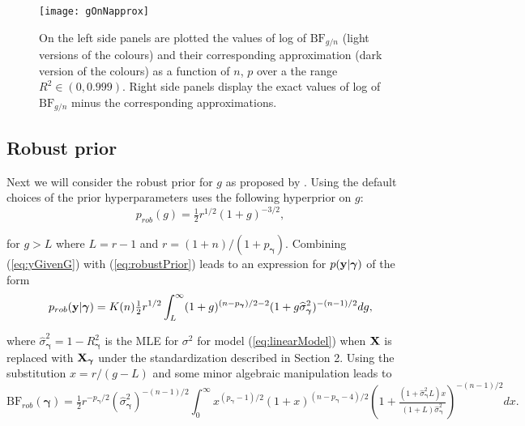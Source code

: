 \documentclass[12pt]{article}
\def\vectorfontone{\bf}
\def\vectorfonttwo{\boldsymbol}
\def\vy{{\vectorfontone y}}                      %
\def\vgamma{{\vectorfonttwo \gamma}}             %
\def\matrixfontone{\bf}
\def\mX{{\matrixfontone X}}                      %
\def\ds{\displaystyle}
\begin{document}
\begin{figure}
	\centering
	\texttt{[image: gOnNapprox]}
	\caption{On the left side panels are plotted the values of log of $\mbox{BF}_{g/n}$ (light versions of the
		colours) and their corresponding approximation (dark version of the colours) 
		as a function of $n$, $p$ over a the range $R^2\in(0,0.999)$. Right side panels display
		the exact values of log of $\mbox{BF}_{g/n}$ minus the corresponding approximations.}
	\label{fig:gonnapprox}
\end{figure}


\subsection{Robust prior}  

Next we will consider the robust prior for $g$ as proposed by \cite{Bayarri2012}. Using the default
choices of the prior hyperparameters \cite{Bayarri2012} uses the following hyperprior on $g$:
\begin{equation}\label{eq:robustPrior}
p_{{rob}}(g) = \tfrac{1}{2}r^{1/2} (1 + g)^{-3/2},
\end{equation}
 
\noindent for $g>L$  where $L = r - 1$ and $r = (1 + n)/(1 + p_\vgamma)$. 
Combining (\ref{eq:yGivenG}) with (\ref{eq:robustPrior})
leads to an expression for $p(\vy|\vgamma)$ of the form
\begin{equation}\label{eq:marginalLikelihoodRobust}
\ds p_{rob}(\vy|\vgamma)
\ds = K(n) \tfrac{1}{2} r^{1/2} 
\int_L^\infty  (1 + g)^{(n - p_\vgamma)/2 - 2}(  1 + g \widehat{\sigma}_\vgamma^2)^{-(n-1)/2} dg,
\end{equation}

\noindent where $\widehat{\sigma}_\vgamma^2 = 1 - R_\vgamma^2$ is the MLE
for $\sigma^2$ for model (\ref{eq:linearModel}) when $\mX$ is replaced with $\mX_\vgamma$ under the standardization described in Section 2.
Using the substitution 
$x = r/(g - L)$ and some minor algebraic
manipulation leads to
%
$$
\ds \mbox{BF}_{{rob}}(\vgamma)
\ds = \tfrac{1}{2} r^{ - p_\vgamma/2} (\widehat{\sigma}_\vgamma^2)^{-(n-1)/2}
\int_0^\infty x^{(p_\vgamma-1)/2} 
(1 + x)^{(n - p_\vgamma - 4)/2}
\left( 1 + \tfrac{(1 + \widehat{\sigma}_\vgamma^2 L)x}{(1 + L)\widehat{\sigma}_\vgamma^2}  \right)^{-(n-1)/2}  dx.
$$
\end{document}
